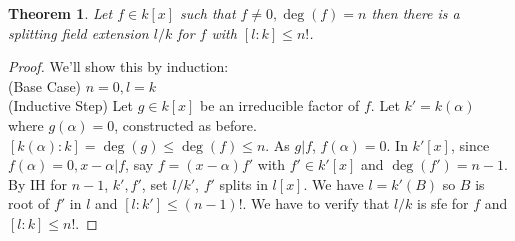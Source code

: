 \documentclass[a4paper,12pt]{article}
\newtheorem{thm}{Theorem}[section]
\begin{document}
\begin{thm}
    Let $f\in k[x]$ such that $f\neq 0, \deg(f)=n$ then there is a splitting field extension $l/k$ for $f$ with $[l:k]\leq n!$. 
\end{thm}
\begin{proof}
    We'll show this by induction:\\
    (Base Case) $n=0,l=k$ \\
    (Inductive Step) Let $g\in k[x]$ be an irreducible factor of $f$. Let $k'=k(\alpha)$ where $g(\alpha)=0$, constructed as before. $[k(\alpha):k]=\deg(g)\leq \deg(f)\leq n$. As $g|f$, $f(\alpha)=0$. In $k'[x]$, since $f(\alpha)=0, x-\alpha | f$, say $f=(x-\alpha)f'$ with $f'\in k'[x]$ and $\deg(f')=n-1$. By IH for $n-1$, $k',f'$, set $l/k'$, $f'$ splits in $l[x]$. We have $l=k'(B)$  so $B$ is root of $f'$ in $l$ and $[l:k']\leq (n-1)!$. We have to verify that $l/k$ is sfe for $f$ and $[l:k]\leq n!$. 
\end{proof}
\newpage
\end{document}
